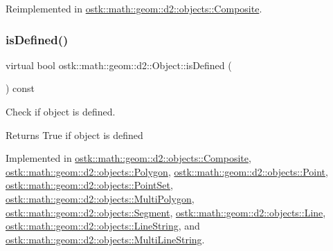 Reimplemented in \hyperlink{classostk_1_1math_1_1geom_1_1d2_1_1objects_1_1_composite_a316fa117952c61b5e7217a9e38528ab7}{ostk\+::math\+::geom\+::d2\+::objects\+::\+Composite}.

\mbox{\label{classostk_1_1math_1_1geom_1_1d2_1_1_object_a456cc7121218d24c1322d0fe54230cc4}} 
\subsubsection{\texorpdfstring{is\+Defined()}{isDefined()}}
{\footnotesize\ttfamily virtual bool ostk\+::math\+::geom\+::d2\+::\+Object\+::is\+Defined (\begin{DoxyParamCaption}{ }\end{DoxyParamCaption}) const\hspace{0.3cm}{\ttfamily [pure virtual]}}



Check if object is defined. 

\begin{DoxyReturn}{Returns}
True if object is defined 
\end{DoxyReturn}


Implemented in \hyperlink{classostk_1_1math_1_1geom_1_1d2_1_1objects_1_1_composite_a6e14791f29bae236167d05de6cbd7b96}{ostk\+::math\+::geom\+::d2\+::objects\+::\+Composite}, \hyperlink{classostk_1_1math_1_1geom_1_1d2_1_1objects_1_1_polygon_a81f92393dad2c6421fd4fe3834f60fa2}{ostk\+::math\+::geom\+::d2\+::objects\+::\+Polygon}, \hyperlink{classostk_1_1math_1_1geom_1_1d2_1_1objects_1_1_point_a245dd2f0268e1f162804489ac911cb0c}{ostk\+::math\+::geom\+::d2\+::objects\+::\+Point}, \hyperlink{classostk_1_1math_1_1geom_1_1d2_1_1objects_1_1_point_set_a6b2dd586eeb7f4fbf659fa9810574315}{ostk\+::math\+::geom\+::d2\+::objects\+::\+Point\+Set}, \hyperlink{classostk_1_1math_1_1geom_1_1d2_1_1objects_1_1_multi_polygon_a27e84e80acbae4c2a7436a4d5c07b576}{ostk\+::math\+::geom\+::d2\+::objects\+::\+Multi\+Polygon}, \hyperlink{classostk_1_1math_1_1geom_1_1d2_1_1objects_1_1_segment_a4e7397f14fd36b0aecd7afddd4fddf84}{ostk\+::math\+::geom\+::d2\+::objects\+::\+Segment}, \hyperlink{classostk_1_1math_1_1geom_1_1d2_1_1objects_1_1_line_a1e2a44eac16df2d9009eebf3aa85afd2}{ostk\+::math\+::geom\+::d2\+::objects\+::\+Line}, \hyperlink{classostk_1_1math_1_1geom_1_1d2_1_1objects_1_1_line_string_a0fd7edff5727e1373dbea759313313cc}{ostk\+::math\+::geom\+::d2\+::objects\+::\+Line\+String}, and \hyperlink{classostk_1_1math_1_1geom_1_1d2_1_1objects_1_1_multi_line_string_a446d9d1344336d6ec8b2ff1e46629ca2}{ostk\+::math\+::geom\+::d2\+::objects\+::\+Multi\+Line\+String}.

